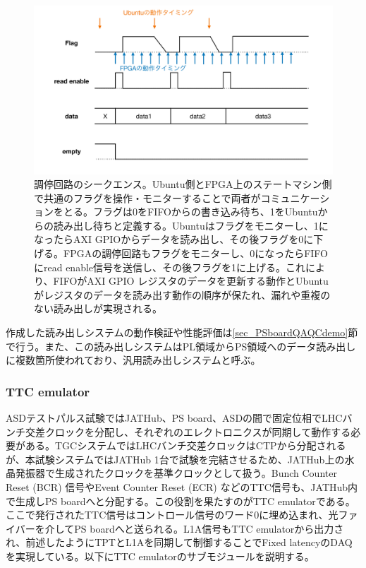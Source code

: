 \begin{figure} 
\centering
\includegraphics[width=16cm]{fig/QAQC/JATHubarbitation.pdf}
\caption[調停回路のシークエンス]{調停回路のシークエンス。Ubuntu側とFPGA上のステートマシン側で共通のフラグを操作・モニターすることで両者がコミュニケーションをとる。フラグは0をFIFOからの書き込み待ち、1をUbuntuからの読み出し待ちと定義する。Ubuntuはフラグをモニターし、1になったらAXI GPIOからデータを読み出し、その後フラグを0に下げる。FPGAの調停回路もフラグをモニターし、0になったらFIFOにread enable信号を送信し、その後フラグを1に上げる。これにより、FIFOがAXI GPIO レジスタのデータを更新する動作とUbuntuがレジスタのデータを読み出す動作の順序が保たれ、漏れや重複のない読み出しが実現される。}
\label{JATHubarbitation}
\end{figure}

作成した読み出しシステムの動作検証や性能評価は\ref{sec_PSboardQAQCdemo}節で行う。また、この読み出しシステムはPL領域からPS領域へのデータ読み出しに複数箇所使われており、汎用読み出しシステムと呼ぶ。


\subsubsection{TTC emulator}
\baselineskip
ASDテストパルス試験ではJATHub、PS board、ASDの間で固定位相でLHCバンチ交差クロックを分配し、それぞれのエレクトロニクスが同期して動作する必要がある。TGCシステムではLHCバンチ交差クロックはCTPから分配されるが、本試験システムではJATHub 1台で試験を完結させるため、JATHub上の水晶発振器で生成されたクロックを基準クロックとして扱う。Bunch Counter Reset (BCR) 信号やEvent Counter Reset (ECR) などのTTC信号も、JATHub内で生成しPS boardへと分配する。この役割を果たすのがTTC emulatorである。ここで発行されたTTC信号はコントロール信号のワード0に埋め込まれ、光ファイバーを介してPS boardへと送られる。L1A信号もTTC emulatorから出力され、前述したようにTPTとL1Aを同期して制御することでFixed latencyのDAQを実現している。以下にTTC emulatorのサブモジュールを説明する。

